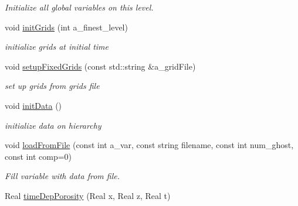 \begin{DoxyCompactItemize}
\begin{DoxyCompactList}\small\item\em Initialize all global variables on this level. \end{DoxyCompactList}\item 
\hypertarget{classamr_mushy_layer_aa29676c4f3489936cc67ee1fefcfc6fa}{void \hyperlink{classamr_mushy_layer_aa29676c4f3489936cc67ee1fefcfc6fa}{init\-Grids} (int a\-\_\-finest\-\_\-level)}\label{classamr_mushy_layer_aa29676c4f3489936cc67ee1fefcfc6fa}

\begin{DoxyCompactList}\small\item\em initialize grids at initial time \end{DoxyCompactList}\item 
\hypertarget{classamr_mushy_layer_ae4714d7bd538ceef23aae93667272158}{void \hyperlink{classamr_mushy_layer_ae4714d7bd538ceef23aae93667272158}{setup\-Fixed\-Grids} (const std\-::string \&a\-\_\-grid\-File)}\label{classamr_mushy_layer_ae4714d7bd538ceef23aae93667272158}

\begin{DoxyCompactList}\small\item\em set up grids from grids file \end{DoxyCompactList}\item 
\hypertarget{classamr_mushy_layer_a651b87329473d360eeaf90569d08e28e}{void \hyperlink{classamr_mushy_layer_a651b87329473d360eeaf90569d08e28e}{init\-Data} ()}\label{classamr_mushy_layer_a651b87329473d360eeaf90569d08e28e}

\begin{DoxyCompactList}\small\item\em initialize data on hierarchy \end{DoxyCompactList}\item 
\hypertarget{classamr_mushy_layer_a89fcf5b782c5325e9fe8ad9ed879dc3d}{void \hyperlink{classamr_mushy_layer_a89fcf5b782c5325e9fe8ad9ed879dc3d}{load\-From\-File} (const int a\-\_\-var, const string filename, const int num\-\_\-ghost, const int comp=0)}\label{classamr_mushy_layer_a89fcf5b782c5325e9fe8ad9ed879dc3d}

\begin{DoxyCompactList}\small\item\em Fill variable with data from file. \end{DoxyCompactList}\item 
\hypertarget{classamr_mushy_layer_a18162ee9e4bea27bf1e2d2c21cba7ac1}{Real \hyperlink{classamr_mushy_layer_a18162ee9e4bea27bf1e2d2c21cba7ac1}{time\-Dep\-Porosity} (Real x, Real z, Real t)}\label{classamr_mushy_layer_a18162ee9e4bea27bf1e2d2c21cba7ac1}


\end{DoxyCompactItemize}
